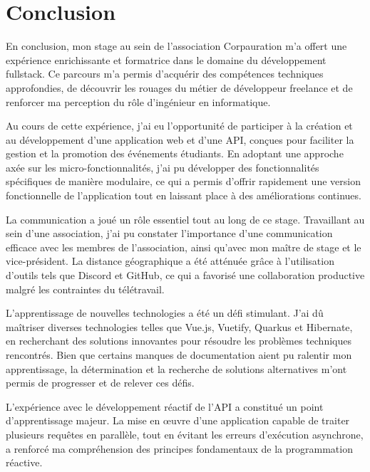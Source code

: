 
\section{Conclusion}

En conclusion, mon stage au sein de l'association Corpauration m'a offert une expérience enrichissante et formatrice dans le domaine du développement fullstack. Ce parcours m'a permis d'acquérir des compétences techniques approfondies, de découvrir les rouages du métier de développeur freelance et de renforcer ma perception du rôle d'ingénieur en informatique.

Au cours de cette expérience, j'ai eu l'opportunité de participer à la création et au développement d'une application web et d'une API, conçues pour faciliter la gestion et la promotion des événements étudiants. En adoptant une approche axée sur les micro-fonctionnalités, j'ai pu développer des fonctionnalités spécifiques de manière modulaire, ce qui a permis d'offrir rapidement une version fonctionnelle de l'application tout en laissant place à des améliorations continues.

La communication a joué un rôle essentiel tout au long de ce stage. Travaillant au sein d'une association, j'ai pu constater l'importance d'une communication efficace avec les membres de l'association, ainsi qu'avec mon maître de stage et le vice-président. La distance géographique a été atténuée grâce à l'utilisation d'outils tels que Discord et GitHub, ce qui a favorisé une collaboration productive malgré les contraintes du télétravail.

L'apprentissage de nouvelles technologies a été un défi stimulant. J'ai dû maîtriser diverses technologies telles que Vue.js, Vuetify, Quarkus et Hibernate, en recherchant des solutions innovantes pour résoudre les problèmes techniques rencontrés. Bien que certains manques de documentation aient pu ralentir mon apprentissage, la détermination et la recherche de solutions alternatives m'ont permis de progresser et de relever ces défis.

L'expérience avec le développement réactif de l'API a constitué un point d'apprentissage majeur. La mise en œuvre d'une application capable de traiter plusieurs requêtes en parallèle, tout en évitant les erreurs d'exécution asynchrone, a renforcé ma compréhension des principes fondamentaux de la programmation réactive.

